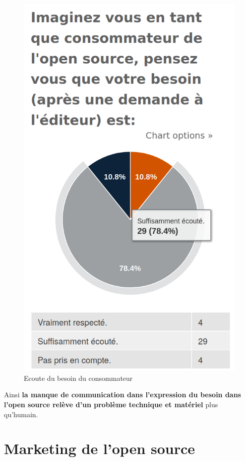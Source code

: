 			\begin{figure}[ht]
				\center
				\includegraphics[scale=0.28]{./img/a12}
				\caption{Ecoute du besoin du consommateur}
			\end{figure}

		Ainsi \textbf{la manque de communication dans l'expression du besoin dans l'open source relève d'un problème technique et matériel} plus qu'humain.

	\newpage

	\section{Marketing de l'open source}

